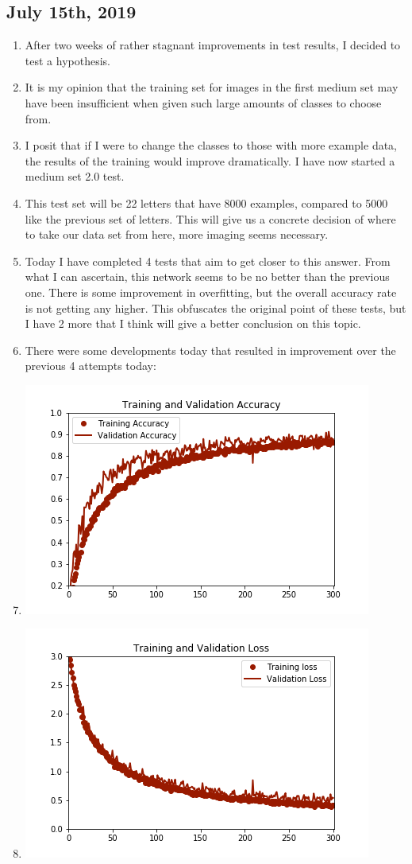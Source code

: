 \documentclass[12pt]{article} %
\begin{document}
\subsection{July 15th, 2019}
\noindent\makebox[\linewidth]{\rule{15cm}{0.4pt}}
\begin{enumerate}[label = (\roman*)]
\item After two weeks of rather stagnant improvements in test results, I decided to test a hypothesis.
\item It is my opinion that the training set for images in the first medium set may have been insufficient when given such large amounts of classes to choose from.
\item I posit that if I were to change the classes to those with more example data, the results of the training would improve dramatically. I have now started a medium set 2.0 test.
\item This test set will be 22 letters that have 8000 examples, compared to 5000 like the previous set of letters. This will give us a concrete decision of where to take our data set from here, more imaging seems necessary.
\item Today I have completed 4 tests that aim to get closer to this answer. From what I can ascertain, this network seems to be no better than the previous one. There is some improvement in overfitting, but the overall accuracy rate is not getting any higher. This obfuscates the original point of these tests, but I have 2 more that I think will give a better conclusion on this topic. 
\item There were some developments today that resulted in improvement over the previous 4 attempts today:
\item\includegraphics{acc_history5-20}
\item\includegraphics{loss_history5-20}

\end{enumerate}
\end{document}
